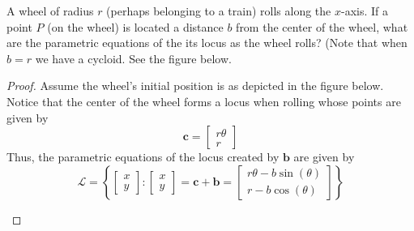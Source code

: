 \begin{exercise} \label{e2.1.4}
    A wheel of radius \( r \) (perhaps belonging to a train) rolls along the \( x \)-axis. If a point \( P \) (on the wheel) is located a distance \( b \) from the center of the wheel, what are the parametric equations of the its locus as the wheel rolls? (Note that when \( b = r \) we have a cycloid. See the figure below.
    
    
    \begin{proof}
        Assume the wheel's initial position is as depicted in the figure below. Notice that the center of the wheel forms a locus when rolling whose points are given by
        \[ \mathbf{c} = \begin{bmatrix} r \theta \\ r \end{bmatrix} \]
        Thus, the parametric equations of the locus created by \( \mathbf{b} \) are given by
        \[
            \mathcal{L} = \left\{ \begin{bmatrix} x \\ y \end{bmatrix}: \begin{bmatrix} x \\ y \end{bmatrix} = \mathbf{c} + \mathbf{b} = \begin{bmatrix} r \theta - b\sin(\theta) \\ r - b\cos(\theta) \end{bmatrix} \right\}
        \]
        
        \begin{center}
\end{center}
\end{proof}
\end{exercise}
